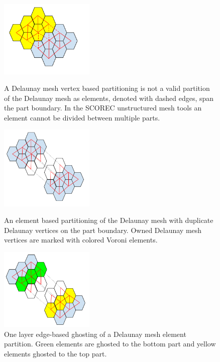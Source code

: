 \documentclass[a4paper]{article}
\begin{document}
\begin{figure} 
\centering
\includegraphics[width=0.4\textwidth]{ghostingOwnershipFig2.png}
\caption{\label{fig:ownership2} A Delaunay mesh vertex based partitioning is not a valid partition of the Delaunay mesh as elements, denoted with dashed edges, span the part boundary.  In the SCOREC unstructured mesh tools an element cannot be divided between multiple parts.}

\includegraphics[width=0.4\textwidth]{ghostingOwnershipFig3.png}
\caption{\label{fig:ownership3} An element based partitioning of the Delaunay mesh with duplicate Delaunay vertices on the part boundary.  Owned Delaunay mesh vertices are marked with colored Voroni elements.}

\includegraphics[width=0.4\textwidth]{ghostingOwnershipFig4.png}
\caption{\label{fig:ownership4} One layer edge-based ghosting of a Delaunay mesh element partition.  Green elements are ghosted to the bottom part and yellow elements ghosted to the top part.}
\end{figure}
\end{document}
